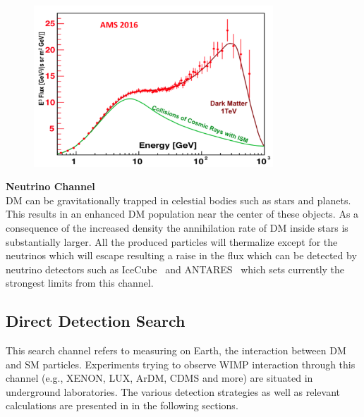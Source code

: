 \begin{figure}[]
	\centering
	\includegraphics[width=0.8\textwidth]{figs/AMS02.png}
	\label{fig:AMS}
\end{figure}  

\textbf{Neutrino Channel}\\

DM can be gravitationally trapped in celestial bodies such as stars and planets. This results in an enhanced DM population near the center of these objects. As a consequence of the increased density the annihilation rate of DM inside stars is substantially larger. All the produced particles will thermalize except for the neutrinos which will escape resulting a raise in the flux which can be detected by neutrino detectors such as IceCube~\cite{Achterberg:2006md} and ANTARES~\cite{Collaboration:2011nsa} which sets currently the strongest limits from this channel.

\subsection{Direct Detection Search}
\label{subsec:directdetection}

This search channel refers to measuring on Earth, the interaction between DM and SM particles. Experiments trying to observe WIMP interaction through this channel (e.g., XENON, LUX, ArDM, CDMS and more) are situated in underground laboratories. The various detection strategies as well as relevant calculations are presented in in the following sections.

